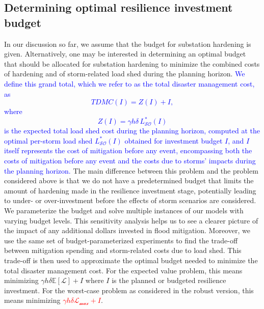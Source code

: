 \documentclass[authoryear,preprint,review,12pt]{elsarticle}\usepackage{amssymb}
\begin{document}
\subsection{Determining optimal resilience investment budget} \label{budget_section}

In our discussion so far, we assume that the budget for substation hardening is given. Alternatively, one may be interested in determining an optimal budget that should be allocated for substation hardening to minimize the combined costs of hardening and of storm-related load shed during the planning horizon. \textcolor{blue}{We define this grand total, which we refer to as the total disaster management cost, as}
\textcolor{blue}{
\begin{equation}
    TDMC(I) = Z(I) + I, \label{tdmc}
\end{equation}
}
\noindent \textcolor{blue}{where}
\textcolor{blue}{
\begin{equation}
    Z(I) = \gamma h \delta \, L_{\mathcal{SO}}^*(I) \label{z_of_i}
\end{equation}
}
\noindent\textcolor{blue}{is the expected total load shed cost during the planning horizon, computed at the optimal per-storm load shed $L_{\mathcal{SO}}^*(I)$ obtained for investment budget $I$, and $I$ itself represents the cost of mitigation before any event, encompassing both the costs of mitigation before any event and the costs due to storms' impacts during the planning horizon.} The main difference between this problem and the problem considered above is that we do not have a predetermined budget that limits the amount of hardening made in the resilience investment stage, potentially leading to under- or over-investment before the effects of storm scenarios are considered. We parameterize the budget and solve multiple instances of our models with varying budget levels. This sensitivity analysis helps us to see a clearer picture of the impact of any additional dollars invested in flood mitigation. Moreover, we use the same set of budget-parameterized experiments to find the trade-off between mitigation spending and storm-related costs due to load shed. 
This trade-off is then used to approximate the optimal budget needed to minimize the total disaster management cost. For the expected value problem, this means minimizing $ \gamma h \delta \mathbb{E}[\mathcal{L}] + I$ where $I$ is the planned or budgeted resilience investment. For the worst-case problem as considered in the robust version, this means minimizing \textcolor{red}{$\gamma h \delta \mathcal{L_{\max}}+I$}.
\end{document}
